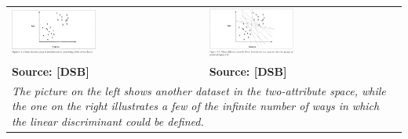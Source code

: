 \begin{tabular}{p{}p{}}
  \includegraphics[width=0.45\textwidth]{4-4c_two_attrib_space.jpg}&\includegraphics[width=0.45\textwidth]{4-5c_general_linear_classifier.jpg} \\ [-1.5ex]
{\fontsize{10}{0}\selectfont \textbf{Source: [DSB]}} & 
{\fontsize{10}{0}\selectfont \textbf{Source: [DSB]}} \\
  \multicolumn{2}{p{0.9\textwidth}}{\tiny \emph{The picture on the left shows another dataset in the two-attribute space, while the one on the right illustrates a few of the infinite number of ways in which the linear discriminant could be defined.}} \\
\end{tabular}
\newpage

